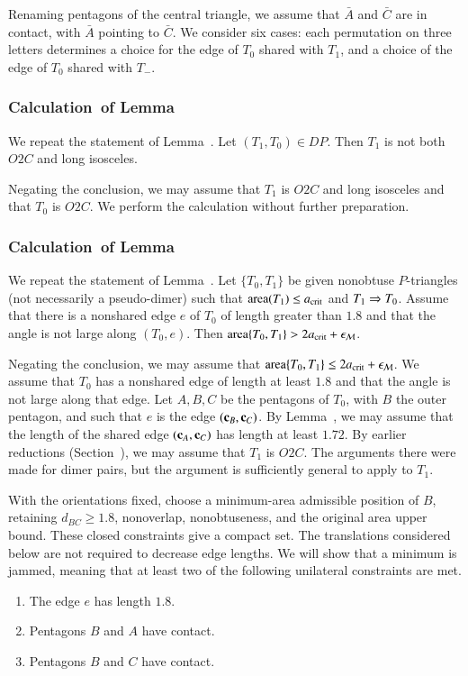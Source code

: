 Renaming pentagons of the central triangle, we assume that $\bar A$
and $\bar C$ are in contact, with $\bar A$ pointing to $\bar C$.  We
consider six cases: each permutation on three letters determines a
choice for the edge of $T_0$ shared with $T_1$, and a choice of the
edge of $T_0$ shared with $T_-$.

\subsubsection{Calculation~of Lemma~}

We repeat the statement of Lemma~.  Let
$(T_1,T_0)\in DP$.  Then $T_1$ is not both $O2C$ and long isosceles.

Negating the conclusion, we may assume that $T_1$ is $O2C$ and long
isosceles and that $T_0$ is $O2C$.  We perform the calculation without
further preparation.

\subsubsection{Calculation~of Lemma~} %

We repeat the statement of Lemma~.  Let $\{T_0,T_1\}$
be given nonobtuse $P$-triangles (not necessarily a pseudo-dimer) such that
${\operatorname{area}}(T_1)\le a_\text{crit}$ and $T_1\Rightarrow T_0$.  Assume that there is a
nonshared edge $e$ of $T_0$ of length greater than $1.8$ and that the
angle is not large along $(T_0,e)$.  Then ${\operatorname{area}}\{T_0,T_1\} > 2a_\text{crit}
+ \epsilon_{\mathcal M}$. %

Negating the conclusion, we may assume that ${\operatorname{area}}\{T_0,T_1\}\le
2a_\text{crit} + \epsilon_{\mathcal M}$.  We assume that $T_0$ has a nonshared edge of length
at least $1.8$ and that the angle is not large along that edge.
Let $A,B,C$ be the pentagons of $T_0$, with $B$ the outer pentagon,
and such that $e$ is the edge $({\mathbf c}_B,{\mathbf c}_C)$.
By Lemma~, we may assume that the length of the
shared edge $({\mathbf c}_A,{\mathbf c}_C)$ has length at least $1.72$.
By earlier reductions (Section~), we may assume
that $T_1$ is $O2C$.  The arguments there were made for dimer pairs, but the argument
is sufficiently general to apply to $T_1$.

With the orientations fixed, choose a minimum-area admissible
position of $B$, retaining $d_{BC}\ge1.8$, nonoverlap,
nonobtuseness, and the original area upper bound. These closed
constraints give a compact set. The translations considered below
are not required to decrease edge lengths. We will show that a
minimum is jammed, meaning that at least two of the following
unilateral constraints are met.
\begin{enumerate}
\item The edge $e$ has length $1.8$.
\item Pentagons $B$ and $A$ have contact.
\item Pentagons $B$ and $C$ have contact.
\end{enumerate}
 
